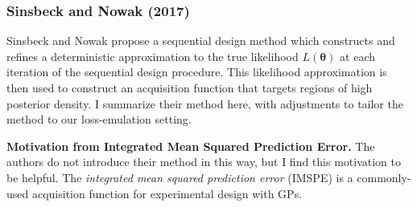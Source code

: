 \documentclass[12pt]{article}
\newcommand{\btheta}{\boldsymbol{\theta}}
\begin{document}
\subsubsection{Sinsbeck and Nowak (2017)}
Sinsbeck and Nowak \cite{doi:10.1137/15M1047659} propose a sequential design method which constructs and refines a deterministic approximation to the true likelihood $L(\btheta)$ at each iteration of the sequential design procedure. 
This likelihood approximation is then used to construct an acquisition function that targets regions of high posterior density. I summarize their method here, with adjustments to tailor the method to our loss-emulation setting. 

\bigskip
\noindent
\textbf{Motivation from Integrated Mean Squared Prediction Error.}
The authors do not introduce their method in this way, but I find this motivation to be helpful. The \textit{integrated mean squared prediction error} (IMSPE) is a commonly-used acquisition function for 
experimental design with GPs. 
\end{document}
